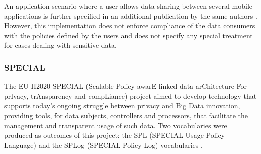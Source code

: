 An application scenario where a user allows data sharing between several mobile applications is further specified in an additional publication by the same authors \citep{hutchison_framework_2013}.
However, this implementation does not enforce compliance of the data consumers with the policies defined by the users and does not specify any special treatment for cases dealing with sensitive data.


\subsubsection{SPECIAL}
\label{sec:special}

The EU H2020 SPECIAL (Scalable Policy-awarE linked data arChitecture For prIvacy, trAnsparency and compLiance) project aimed to develop technology that supports today's ongoing struggle between privacy and Big Data innovation, providing tools, for data subjects, controllers and processors, that facilitate the management and transparent usage of such data.
Two vocabularies were produced as outcomes of this project: the SPL (SPECIAL Usage Policy Language) and the SPLog (SPECIAL Policy Log) vocabularies \citep{gangemi_scalable_2018}.

